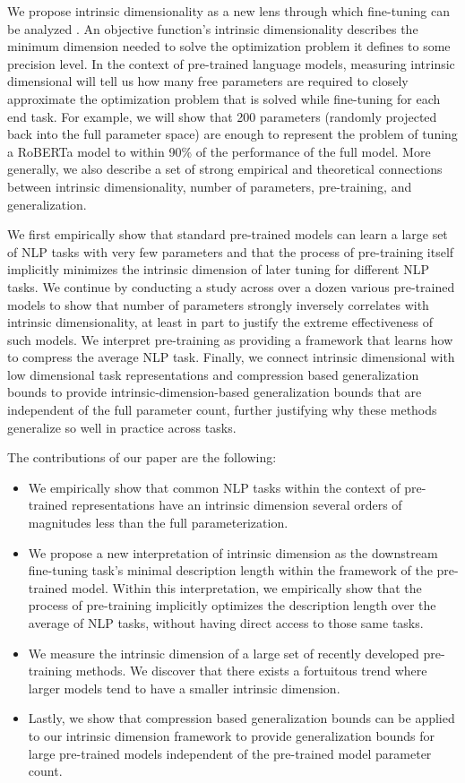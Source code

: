 We propose intrinsic dimensionality as a new lens through which fine-tuning can be analyzed \citep{intrinsic_dimension}. An objective function's intrinsic dimensionality describes the minimum dimension needed to solve the optimization problem it defines to some precision level. In the context of pre-trained language models, measuring intrinsic dimensional will tell us how many free parameters are required to closely approximate the optimization problem that is solved while fine-tuning for each end task. For example, we will show that 200 parameters (randomly projected back into the full parameter space) are enough to represent the problem of tuning a RoBERTa model to within 90\% of the performance of the full model. More generally, we also describe a set of strong empirical and theoretical connections between intrinsic dimensionality, number of parameters, pre-training, and generalization.

We first empirically show that standard pre-trained models can learn a large set of NLP tasks with very few parameters and that the process of pre-training itself implicitly minimizes the intrinsic dimension of later tuning for different NLP tasks. We continue by conducting a study across over a dozen various pre-trained models to show that number of parameters strongly inversely correlates with intrinsic dimensionality, at least in part to justify the extreme effectiveness of such models. We interpret pre-training as providing a framework that learns how to compress the average NLP task.  Finally, we connect intrinsic dimensional with low dimensional task representations and compression based generalization bounds to provide intrinsic-dimension-based generalization bounds that are independent of the full parameter count, further justifying why these methods generalize so well in practice across tasks.

The contributions of our paper are the following:

\begin{itemize}

    \item We empirically show that common NLP tasks within the context of pre-trained representations have an intrinsic dimension several orders of magnitudes less than the full parameterization.
    \item We propose a new interpretation of intrinsic dimension as the downstream fine-tuning task's minimal description length within the framework of the pre-trained model. Within this interpretation, we empirically show that the process of pre-training implicitly optimizes the description length over the average of NLP tasks, without having direct access to those same tasks.
    \item We measure the intrinsic dimension of a large set of recently developed pre-training methods. We discover that there exists a  fortuitous trend where larger models tend to have a smaller intrinsic dimension.
    \item Lastly, we show that compression based generalization bounds can be applied to our intrinsic dimension framework to provide generalization bounds for large pre-trained models independent of the pre-trained model parameter count.
\end{itemize}

